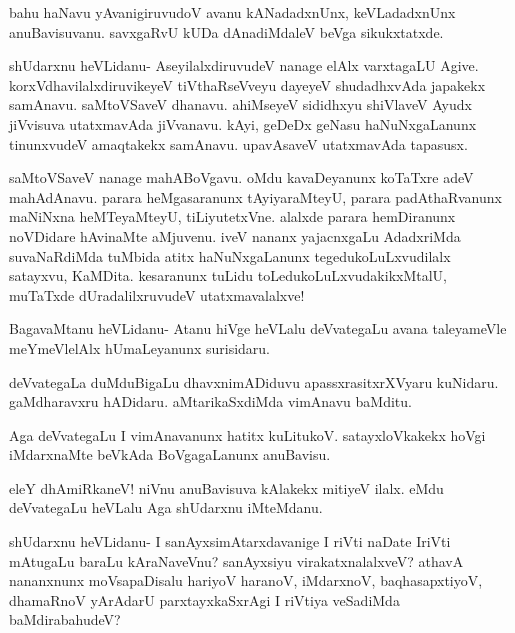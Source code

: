 \documentclass{article}
\begin{document}
\begin{mng}%
bahu haNavu yAvanigiruvudoV avanu kANadadxnUnx, keVLadadxnUnx
anuBavisuvanu. savxgaRvU kUDa dAnadiMdaleV beVga sikukxtatxde.
\end{mng}

\begin{mng}%
shUdarxnu heVLidanu- AseyilalxdiruvudeV nanage elAlx varxtagaLU
Agive. korxVdhavilalxdiruvikeyeV tiVthaRseVveyu dayeyeV shudadhxvAda
japakekx samAnavu. saMtoVSaveV dhanavu. ahiMseyeV sididhxyu
shiVlaveV Ayudx jiVvisuva utatxmavAda jiVvanavu. kAyi, geDeDx geNasu
haNuNxgaLanunx tinunxvudeV amaqtakekx samAnavu. upavAsaveV utatxmavAda
tapasusx.
\end{mng}

\begin{mng}%
saMtoVSaveV nanage mahABoVgavu. oMdu kavaDeyanunx
koTaTxre adeV mahAdAnavu. parara heMgasaranunx tAyiyaraMteyU, parara
padAthaRvanunx maNiNxna heMTeyaMteyU, tiLiyutetxVne. alalxde parara hemDiranunx
noVDidare hAvinaMte aMjuvenu. iveV nananx yajacnxgaLu AdadxriMda
suvaNaRdiMda tuMbida atitx haNuNxgaLanunx tegedukoLuLxvudilalx satayxvu,
KaMDita. kesaranunx tuLidu toLedukoLuLxvudakikxMtalU, muTaTxde dUradalilxruvudeV
utatxmavalalxve!
\end{mng}

\begin{mng}%
BagavaMtanu heVLidanu- Atanu hiVge heVLalu deVvategaLu avana
taleyameVle meYmeVlelAlx hUmaLeyanunx surisidaru.
\end{mng}

\begin{mng}%
deVvategaLa duMduBigaLu dhavxnimADiduvu apassxrasitxrXVyaru kuNidaru.
gaMdharavxru hADidaru. aMtarikaSxdiMda vimAnavu baMditu.
\end{mng}

\begin{mng}%
Aga deVvategaLu I vimAnavanunx hatitx kuLitukoV. satayxloVkakekx
hoVgi iMdarxnaMte beVkAda BoVgagaLanunx anuBavisu.
\end{mng}

\begin{mng}%
eleY dhAmiRkaneV! niVnu anuBavisuva kAlakekx mitiyeV
ilalx. eMdu deVvategaLu heVLalu Aga shUdarxnu iMteMdanu.
\end{mng}

\begin{mng}%
shUdarxnu heVLidanu- I sanAyxsimAtarxdavanige I riVti naDate
IriVti mAtugaLu baraLu kAraNaveVnu? sanAyxsiyu virakatxnalalxveV? athavA
nananxnunx moVsapaDisalu hariyoV haranoV, iMdarxnoV, baqhasapxtiyoV,
dhamaRnoV yArAdarU parxtayxkaSxrAgi I riVtiya veSadiMda baMdirabahudeV?
\end{mng}
\end{document}
